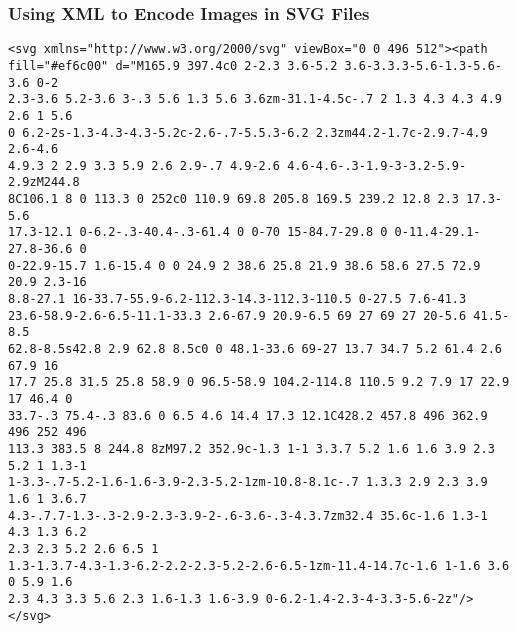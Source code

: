 \documentclass[14pt,aspectratio=169]{beamer}
\begin{document}
%
\begin{frame}[fragile]
  \frametitle{Using XML to Encode Images in SVG Files}
  \normalsize
  \begin{minipage}{6in}
    \vspace*{.05in}
    \begin{verbatim}
<svg xmlns="http://www.w3.org/2000/svg" viewBox="0 0 496 512"><path
fill="#ef6c00" d="M165.9 397.4c0 2-2.3 3.6-5.2 3.6-3.3.3-5.6-1.3-5.6-3.6 0-2
2.3-3.6 5.2-3.6 3-.3 5.6 1.3 5.6 3.6zm-31.1-4.5c-.7 2 1.3 4.3 4.3 4.9 2.6 1 5.6
0 6.2-2s-1.3-4.3-4.3-5.2c-2.6-.7-5.5.3-6.2 2.3zm44.2-1.7c-2.9.7-4.9 2.6-4.6
4.9.3 2 2.9 3.3 5.9 2.6 2.9-.7 4.9-2.6 4.6-4.6-.3-1.9-3-3.2-5.9-2.9zM244.8
8C106.1 8 0 113.3 0 252c0 110.9 69.8 205.8 169.5 239.2 12.8 2.3 17.3-5.6
17.3-12.1 0-6.2-.3-40.4-.3-61.4 0 0-70 15-84.7-29.8 0 0-11.4-29.1-27.8-36.6 0
0-22.9-15.7 1.6-15.4 0 0 24.9 2 38.6 25.8 21.9 38.6 58.6 27.5 72.9 20.9 2.3-16
8.8-27.1 16-33.7-55.9-6.2-112.3-14.3-112.3-110.5 0-27.5 7.6-41.3
23.6-58.9-2.6-6.5-11.1-33.3 2.6-67.9 20.9-6.5 69 27 69 27 20-5.6 41.5-8.5
62.8-8.5s42.8 2.9 62.8 8.5c0 0 48.1-33.6 69-27 13.7 34.7 5.2 61.4 2.6 67.9 16
17.7 25.8 31.5 25.8 58.9 0 96.5-58.9 104.2-114.8 110.5 9.2 7.9 17 22.9 17 46.4 0
33.7-.3 75.4-.3 83.6 0 6.5 4.6 14.4 17.3 12.1C428.2 457.8 496 362.9 496 252 496
113.3 383.5 8 244.8 8zM97.2 352.9c-1.3 1-1 3.3.7 5.2 1.6 1.6 3.9 2.3 5.2 1 1.3-1
1-3.3-.7-5.2-1.6-1.6-3.9-2.3-5.2-1zm-10.8-8.1c-.7 1.3.3 2.9 2.3 3.9 1.6 1 3.6.7
4.3-.7.7-1.3-.3-2.9-2.3-3.9-2-.6-3.6-.3-4.3.7zm32.4 35.6c-1.6 1.3-1 4.3 1.3 6.2
2.3 2.3 5.2 2.6 6.5 1
1.3-1.3.7-4.3-1.3-6.2-2.2-2.3-5.2-2.6-6.5-1zm-11.4-14.7c-1.6 1-1.6 3.6 0 5.9 1.6
2.3 4.3 3.3 5.6 2.3 1.6-1.3 1.6-3.9 0-6.2-1.4-2.3-4-3.3-5.6-2z"/></svg>
    \end{verbatim}
  \end{minipage}
\end{frame}
\end{document}
